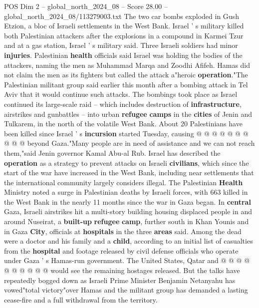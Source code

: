 \begin{textsample}{POS Dim 2 – global\_north\_2024\_08 – Score 28.00 – global\_north\_2024\_08/113279003.txt}
The two car bombs exploded in Gush Etzion, a bloc of Israeli settlements in the West Bank.
Israel ' s military killed both Palestinian attackers after the explosions in a compound in Karmei Tzur and at a gas station, Israel ' s military said.
Three Israeli soldiers had minor \textbf{injuries}.
Palestinian \textbf{health} officials said Israel was holding the bodies of the attackers, naming the men as Muhammad Marqa and Zoodhi Afifeh.
Hamas did not claim the men as its fighters but called the attack a"heroic \textbf{operation}."The Palestinian militant group said earlier this month after a bombing attack in Tel Aviv that it would continue such attacks.
The bombings took place as Israel continued its large-scale raid -- which includes destruction of \textbf{infrastructure}, airstrikes and gunbattles -- into urban \textbf{refugee} \textbf{camps} in the \textbf{cities} of Jenin and Tulkarem, in the north of the volatile West Bank.
About 20 Palestinians have been killed since Israel ' s \textbf{incursion} started Tuesday, causing @ @ @ @ @ @ @ @ @ @ beyond Gaza."Many people are in need of assistance and we can not reach them,"said Jenin governor Kamal Abu-al Rub.
Israel has described the \textbf{operation} as a strategy to prevent attacks on Israeli \textbf{civilians}, which since the start of the war have increased in the West Bank, including near settlements that the international community largely considers illegal.
The Palestinian \textbf{Health} Ministry noted a surge in Palestinian deaths by Israeli forces, with 663 killed in the West Bank in the nearly 11 months since the war in Gaza began.
In \textbf{central} Gaza, Israeli airstrikes hit a multi-story building housing displaced people in and around Nuseirat, a \textbf{built-up} \textbf{refugee} \textbf{camp}, further south in Khan Younis and in Gaza \textbf{City}, officials at \textbf{hospitals} in the three \textbf{areas} said.
Among the dead were a doctor and his family and a \textbf{child}, according to an initial list of casualties from the \textbf{hospital} and footage released by civil defense officials who operate under Gaza ' s Hamas-run government.
The United States, Qatar and @ @ @ @ @ @ @ @ @ @ would see the remaining hostages released.
But the talks have repeatedly bogged down as Israeli Prime Minister Benjamin Netanyahu has vowed"total victory"over Hamas and the militant group has demanded a lasting cease-fire and a full withdrawal from the territory.

\end{textsample}
